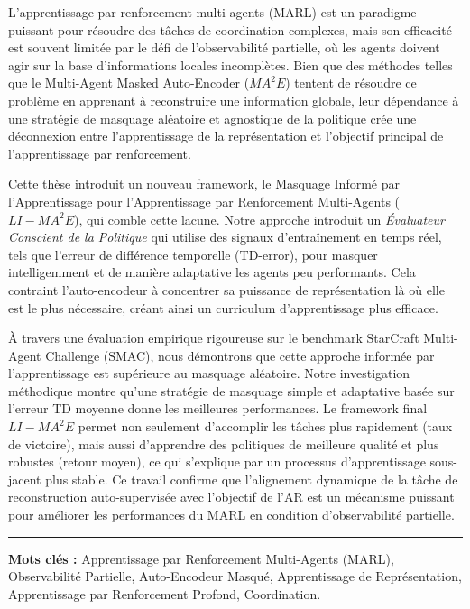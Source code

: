 


L'apprentissage par renforcement multi-agents (MARL) est un paradigme puissant pour résoudre des tâches de coordination complexes, mais son efficacité est souvent limitée par le défi de l'observabilité partielle, où les agents doivent agir sur la base d'informations locales incomplètes. Bien que des méthodes telles que le Multi-Agent Masked Auto-Encoder (${MA}^2E$) tentent de résoudre ce problème en apprenant à reconstruire une information globale, leur dépendance à une stratégie de masquage aléatoire et agnostique de la politique crée une déconnexion entre l'apprentissage de la représentation et l'objectif principal de l'apprentissage par renforcement.

Cette thèse introduit un nouveau framework, le Masquage Informé par l'Apprentissage pour l'Apprentissage par Renforcement Multi-Agents ($LI-{MA}^2E$), qui comble cette lacune. Notre approche introduit un \textit{Évaluateur Conscient de la Politique} qui utilise des signaux d'entraînement en temps réel, tels que l'erreur de différence temporelle (TD-error), pour masquer intelligemment et de manière adaptative les agents peu performants. Cela contraint l'auto-encodeur à concentrer sa puissance de représentation là où elle est le plus nécessaire, créant ainsi un curriculum d'apprentissage plus efficace.

À travers une évaluation empirique rigoureuse sur le benchmark StarCraft Multi-Agent Challenge (SMAC), nous démontrons que cette approche informée par l'apprentissage est supérieure au masquage aléatoire. Notre investigation méthodique montre qu'une stratégie de masquage simple et adaptative basée sur l'erreur TD moyenne donne les meilleures performances. Le framework final $LI-{MA}^2E$ permet non seulement d'accomplir les tâches plus rapidement (taux de victoire), mais aussi d'apprendre des politiques de meilleure qualité et plus robustes (retour moyen), ce qui s'explique par un processus d'apprentissage sous-jacent plus stable. Ce travail confirme que l'alignement dynamique de la tâche de reconstruction auto-supervisée avec l'objectif de l'AR est un mécanisme puissant pour améliorer les performances du MARL en condition d'observabilité partielle.

\vspace{1cm}


\noindent\rule[2pt]{\textwidth}{0.5pt}

{\textbf{Mots clés :}}
Apprentissage par Renforcement Multi-Agents (MARL), Observabilité Partielle, Auto-Encodeur Masqué, Apprentissage de Représentation, Apprentissage par Renforcement Profond, Coordination.



